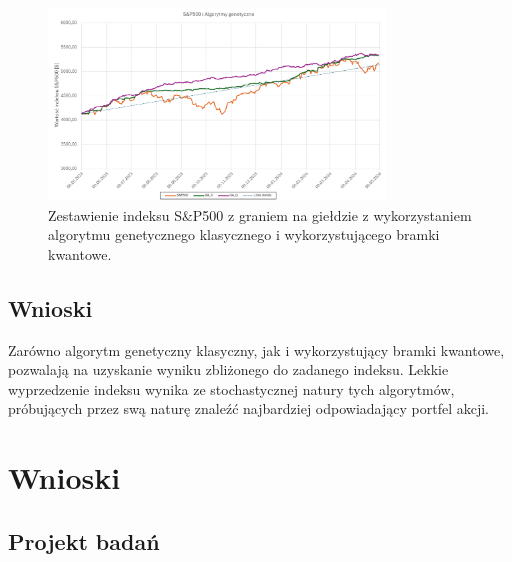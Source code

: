 \documentclass[polish,envcountsect,10pt]{article}
\begin{document}
\begin{figure}[H]
    \centering
    \includegraphics[width=0.8\textwidth]{GA_Q.png}
    \caption{Zestawienie indeksu S\&P500 z graniem na giełdzie z wykorzystaniem algorytmu genetycznego klasycznego i wykorzystującego bramki kwantowe. }
    \label{fig:GA_Q}
\end{figure}

\subsection{Wnioski}

Zarówno algorytm genetyczny klasyczny, jak i wykorzystujący bramki kwantowe, pozwalają na uzyskanie wyniku zbliżonego do zadanego indeksu. Lekkie wyprzedzenie indeksu wynika ze stochastycznej natury tych algorytmów, próbujących przez swą naturę znaleźć najbardziej odpowiadający portfel akcji.

\section{Wnioski}

\subsection{Projekt badań}
\end{document}

